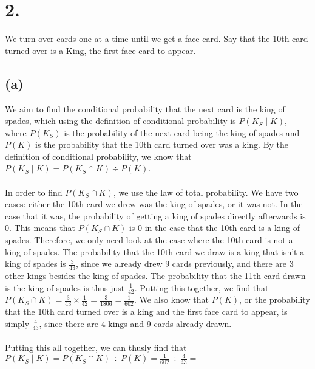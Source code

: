 \documentclass{article}
\begin{document}
\section*{2.}
{\Large
We turn over cards one at a time until we get a face card. Say that the 10th card turned over is a King, the first face card to appear.

\subsection*{(a)}
We aim to find the conditional probability that the next card is the king of spades, which using the definition of conditional probability is $P(K_S \mid K)$, where $P(K_S)$ is the probability of the next card being the king of spades and $P(K)$ is the probability that the 10th card turned over was a king. By the definition of conditional probability, we know that $P(K_S \mid K) = P(K_S \cap K) \div P(K)$. \\ \\
In order to find $P(K_S \cap K)$, we use the law of total probability. We have two cases: either the 10th card we drew was the king of spades, or it was not. In the case that it was, the probability of getting a king of spades directly afterwards is 0. This means that $P(K_S \cap K)$ is 0 in the case that the 10th card is a king of spades. Therefore, we only need look at the case where the 10th card is not a king of spades. The probability that the 10th card we draw is a king that isn't a king of spades is $\frac{3}{43}$, since we already drew 9 cards previously, and there are 3 other kings besides the king of spades. The probability that the 11th card drawn is the king of spades is thus just $\frac{1}{42}$. Putting this together, we find that $P(K_S \cap K) = \frac{3}{43} \times \frac{1}{42} = \frac{3}{1806} = \frac{1}{602}$. We also know that $P(K)$, or the probability that the 10th card turned over is a king and the first face card to appear, is simply $\frac{4}{43}$, since there are 4 kings and 9 cards already drawn. \\ \\
Putting this all together, we can thusly find that $P(K_S \mid K) = P(K_S \cap K) \div P(K) = \frac{1}{602} \div \frac{4}{43} = $ 

}
\end{document}
